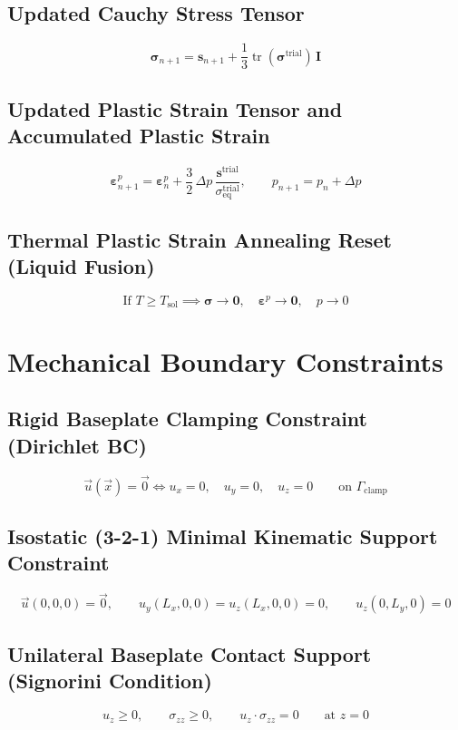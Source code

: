 \documentclass[10pt,a4paper]{article}
\begin{document}
\subsection*{Updated Cauchy Stress Tensor}
\[
\boldsymbol{\sigma}_{n+1} = \mathbf{s}_{n+1} + \frac{1}{3}\operatorname{tr}(\boldsymbol{\sigma}^{\mathrm{trial}})\,\mathbf{I}
\]

\subsection*{Updated Plastic Strain Tensor and Accumulated Plastic Strain}
\[
\boldsymbol{\varepsilon}^p_{n+1} = \boldsymbol{\varepsilon}^p_n + \frac{3}{2}\,\Delta p\,\frac{\mathbf{s}^{\mathrm{trial}}}{\sigma_{\mathrm{eq}}^{\mathrm{trial}}}, \qquad p_{n+1} = p_n + \Delta p
\]

\subsection*{Thermal Plastic Strain Annealing Reset (Liquid Fusion)}
\[
\text{If } T \ge T_{\mathrm{sol}} \implies \boldsymbol{\sigma} \to \mathbf{0}, \quad \boldsymbol{\varepsilon}^p \to \mathbf{0}, \quad p \to 0
\]

\clearpage
\section{Mechanical Boundary Constraints}

\subsection*{Rigid Baseplate Clamping Constraint (Dirichlet BC)}
\[
\vec{u}(\vec{x}) = \vec{0} \iff u_x = 0, \quad u_y = 0, \quad u_z = 0 \qquad \text{on } \Gamma_{\mathrm{clamp}}
\]

\subsection*{Isostatic (3-2-1) Minimal Kinematic Support Constraint}
\[
\vec{u}(0,0,0) = \vec{0}, \qquad u_y(L_x,0,0) = u_z(L_x,0,0) = 0, \qquad u_z(0,L_y,0) = 0
\]

\subsection*{Unilateral Baseplate Contact Support (Signorini Condition)}
\[
u_z \ge 0, \qquad \sigma_{zz} \ge 0, \qquad u_z \cdot \sigma_{zz} = 0 \qquad \text{at } z = 0
\]
\end{document}
